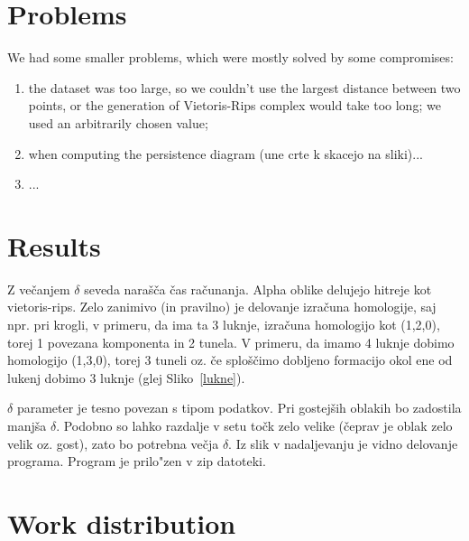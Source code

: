 \documentclass[11pt]{article}
\begin{document}
\section{Problems}

We had some smaller problems, which were mostly solved by some compromises:

\begin{enumerate}
\item the dataset was too large, so we couldn't use the largest distance between two points, or the generation of Vietoris-Rips complex would take too long; we used an arbitrarily chosen value;

\item when computing the persistence diagram (une crte k skacejo na sliki)...

\item ...
\end{enumerate}

\section{Results}

Z večanjem $\delta$ seveda narašča čas računanja. Alpha oblike delujejo hitreje kot vietoris-rips. Zelo zanimivo (in pravilno) je delovanje izračuna homologije, saj npr. pri krogli, v primeru, da ima ta 3 luknje, izračuna homologijo kot (1,2,0), torej 1 povezana komponenta in 2 tunela. V primeru, da imamo 4 luknje dobimo homologijo (1,3,0), torej 3 tuneli oz. če sploščimo dobljeno formacijo okol ene od lukenj dobimo 3 luknje (glej Sliko~\ref{lukne}).


$\delta$ parameter je tesno povezan s tipom podatkov. Pri gostejših oblakih bo zadostila manjša $\delta$. Podobno so lahko razdalje v setu točk zelo velike (čeprav je oblak zelo velik oz. gost), zato bo potrebna večja $\delta$. Iz slik v nadaljevanju je vidno delovanje programa. Program je prilo"zen v zip datoteki.




\section{Work distribution}
\end{document}
